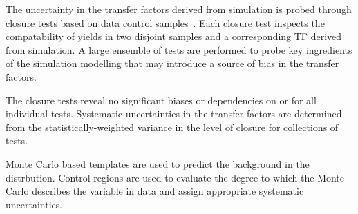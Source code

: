 The uncertainty in the transfer factors derived from simulation is
probed through closure tests based on data control
samples~\cite{RA1Paper2012}. Each closure test inspects the
compatability of yields in two disjoint samples and a corresponding TF
derived from simulation. A large ensemble of tests are performed to
probe key ingredients of the simulation modelling that may introduce a
source of bias in the transfer factors.

%

The closure tests reveal no significant biases or dependencies on
\njet or \scalht for all individual tests. Systematic uncertainties in
the transfer factors are determined from the statistically-weighted
variance in the level of closure for collections of
tests.

Monte Carlo based templates are used to predict the background in the \mht distrbution. Control regions are used to evaluate the degree to which the Monte Carlo describes the variable in data and assign appropriate systematic uncertainties.


